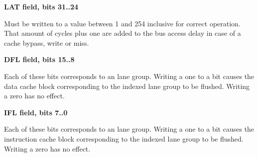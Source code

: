 \begin{itemize}
\noindent\textbf{LAT field, bits 31..24}

\noindent Must be written to a value between 1 and 254 inclusive for correct 
operation. That amount of cycles plus one are added to the bus access delay in 
case of a cache bypass, write or miss.

\noindent\textbf{DFL field, bits 15..8}

\noindent Each of these bits corresponds to an \rvex{} lane group. Writing a one 
to a bit causes the data cache block corresponding to the indexed lane group to 
be flushed. Writing a zero has no effect.

\noindent\textbf{IFL field, bits 7..0}

\noindent Each of these bits corresponds to an \rvex{} lane group. Writing a one 
to a bit causes the instruction cache block corresponding to the indexed lane 
group to be flushed. Writing a zero has no effect.

\end{itemize}

